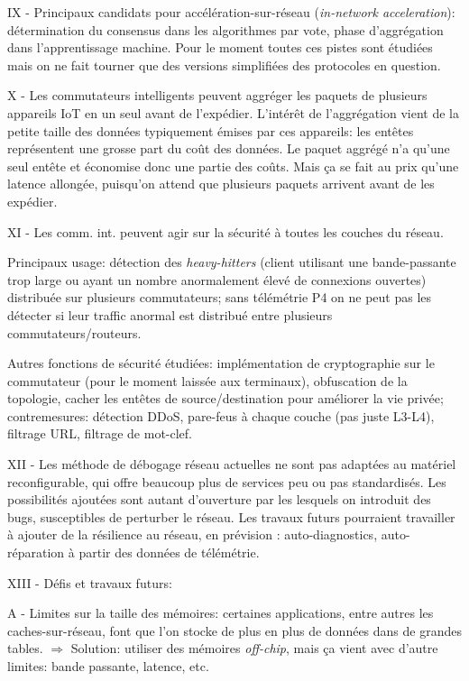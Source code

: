 IX - Principaux candidats pour accélération-sur-réseau (\emph{in-network acceleration}): détermination du consensus dans les algorithmes par vote, phase d'aggrégation dans l'apprentissage machine. Pour le moment toutes ces pistes sont étudiées mais on ne fait tourner que des versions simplifiées des protocoles en question.

X - Les commutateurs intelligents peuvent aggréger les paquets de plusieurs appareils IoT en un seul avant de l'expédier. L'intérêt de l'aggrégation vient de la petite taille des données typiquement émises par ces appareils: les entêtes représentent une grosse part du coût des données. Le paquet aggrégé n'a qu'une seul entête et économise donc une partie des coûts. Mais ça se fait au prix qu'une latence allongée, puisqu'on attend que plusieurs paquets arrivent avant de les expédier.

XI - Les comm. int. peuvent agir sur la sécurité à toutes les couches du réseau.

Principaux usage: détection des \emph{heavy-hitters} (client utilisant une bande-passante trop large ou ayant un nombre anormalement élevé de connexions ouvertes) distribuée sur plusieurs commutateurs; sans télémétrie P4 on ne peut pas les détecter si leur traffic anormal est distribué entre plusieurs commutateurs/routeurs.

Autres fonctions de sécurité étudiées: implémentation de cryptographie sur le commutateur (pour le moment laissée aux terminaux), obfuscation de la topologie, cacher les entêtes de source/destination pour améliorer la vie privée; contremesures: détection DDoS, pare-feus à chaque couche (pas juste L3-L4), filtrage URL, filtrage de mot-clef.

XII - Les méthode de débogage réseau actuelles ne sont pas adaptées au matériel reconfigurable, qui offre beaucoup plus de services peu ou pas standardisés. Les possibilités ajoutées sont autant d'ouverture par les lesquels on introduit des bugs, susceptibles de perturber le réseau. Les travaux futurs pourraient travailler à ajouter de la résilience au réseau, en prévision : auto-diagnostics, auto-réparation à partir des données de télémétrie.

XIII - Défis et travaux futurs:

A - Limites sur la taille des mémoires: certaines applications, entre autres les caches-sur-réseau, font que l'on stocke de plus en plus de données dans de grandes tables.
$\Rightarrow$ Solution: utiliser des mémoires \emph{off-chip}, mais ça vient avec d'autre limites: bande passante, latence, etc.

